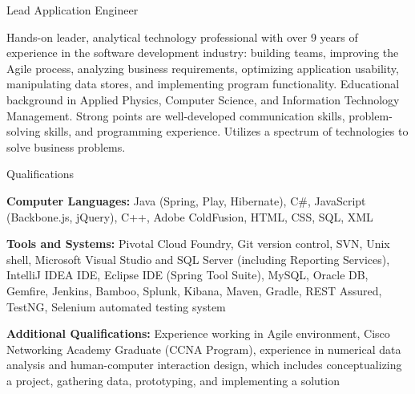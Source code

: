 



\vspace{1mm}

\begin{Large}\textsf{Lead Application Engineer}\end{Large} \vspace{-2mm}

\begin{itemize1}
	\item Hands-on leader, analytical technology professional with over 9 years of experience in the software development industry: building teams, improving the Agile process, analyzing business requirements, optimizing application usability, manipulating data stores, and implementing program functionality.  Educational background in Applied Physics, Computer Science, and Information Technology Management. Strong points are well-developed communication skills, problem-solving skills, and programming experience. Utilizes a spectrum of technologies to solve business problems.
\end{itemize1}

\begin{Large}\textsf{Qualifications}\end{Large} \vspace{-2mm}

\begin{itemize1}
	\item \textbf{Computer Languages:} Java (Spring, Play, Hibernate), C\#, JavaScript (Backbone.js, jQuery), C++, Adobe ColdFusion, HTML, CSS, SQL, XML \vspace{2mm}
	\item \textbf{Tools and Systems:} Pivotal Cloud Foundry, Git version control, SVN, Unix shell, Microsoft Visual Studio and SQL Server (including Reporting Services), IntelliJ IDEA IDE, Eclipse IDE (Spring Tool Suite), MySQL, Oracle DB, Gemfire, Jenkins, Bamboo, Splunk, Kibana, Maven, Gradle, REST Assured, TestNG, Selenium automated testing system \vspace{2mm}
	\item \textbf{Additional Qualifications:} Experience working in Agile environment, Cisco Networking Academy Graduate (CCNA Program), experience in numerical data analysis and human-computer interaction design, which includes conceptualizing a project, gathering data, prototyping, and implementing a solution
\end{itemize1}

